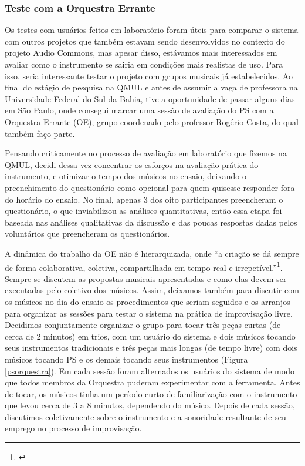 \subsubsection{Teste com a Orquestra Errante}
Os testes com usuários feitos em laboratório foram úteis para comparar o sistema com outros projetos que também estavam sendo desenvolvidos no contexto do projeto Audio Commons, mas apesar disso, estávamos mais interessados em avaliar como o instrumento se sairia em condições mais realistas de uso. Para isso, seria interessante testar o projeto com grupos musicais já estabelecidos. Ao final do estágio de pesquisa na QMUL e antes de assumir a vaga de professora na Universidade Federal do Sul da Bahia, tive a oportunidade de passar alguns dias em São Paulo, onde consegui marcar uma sessão de avaliação do PS com a Orquestra Errante (OE), grupo coordenado pelo professor Rogério Costa, do qual também faço parte. 


Pensando criticamente no processo de avaliação em laboratório que fizemos na QMUL, decidi dessa vez concentrar os esforços na avaliação prática do instrumento, e otimizar o tempo dos músicos no ensaio, deixando o preenchimento do questionário como opcional para quem quisesse responder fora do horário do ensaio. No final, apenas 3 dos oito participantes preencheram o questionário, o que inviabilizou as análises quantitativas, então essa etapa foi baseada nas análises qualitativas da discussão e das poucas respostas dadas pelos voluntários que preencheram os questionários. 

A dinâmica do trabalho da OE não é hierarquizada, onde ``a criação se dá sempre de forma colaborativa, coletiva, compartilhada em tempo real e irrepetível.''\footnote{\cite{costa2013orquestra}}. Sempre se discutem as propostas musicais apresentadas e como elas devem ser executadas pelo coletivo dos músicos. Assim, deixamos também para discutir com os músicos no dia do ensaio os procedimentos que seriam seguidos e os arranjos para organizar as sessões para testar o sistema na prática de improvisação livre. Decidimos conjuntamente organizar o grupo para tocar três peças curtas (de cerca de 2 minutos) em trios, com um usuário do sistema e dois músicos tocando seus instrumentos tradicionais e três peças mais longas (de tempo livre) com dois músicos tocando PS e os demais tocando seus instrumentos (Figura \ref{psorquestra}). Em cada sessão foram alternados os usuários do sistema de modo que todos membros da Orquestra puderam experimentar com a ferramenta. Antes de tocar, os músicos tinha um período curto de familiarização com o instrumento que levou cerca de 3 a 8 minutos, dependendo do músico. Depois de cada sessão, discutimos coletivamente sobre o instrumento e a sonoridade resultante de seu emprego no processo de improvisação.



